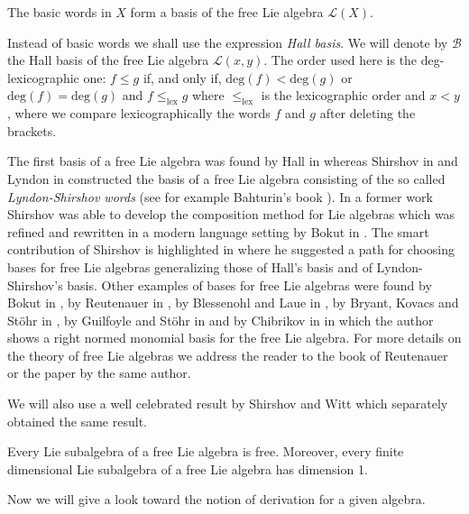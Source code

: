 \documentclass{cimart}
\begin{document}
\begin{theorem} 
The basic words in $X$ form a basis of the free Lie algebra $\mathcal{L}(X)$.
\end{theorem}

Instead of basic words we shall use the expression \textit{Hall basis}. We will denote by $\mathcal{B}$ the Hall basis of the free Lie algebra $\mathcal{L}(x, y)$. The order used here is the deg-lexicographic one: $f \leq g$ if, and only if, $\mbox{deg}(f) < \mbox{deg}(g)$ or $\mbox{deg}(f) = \mbox{deg}(g)$ and $f \leq_{\mbox{lex}} g$ where $\leq_{\mbox{lex}}$ is the lexicographic order and $x < y$, where we compare lexicographically the words $f$ and $g$ after deleting the brackets.

The first basis of a free Lie algebra was found by Hall in \cite{hal1} whereas Shirshov in \cite{shi2} and Lyndon in \cite{lyn1} constructed the basis of a free Lie algebra consisting of the so called \textit{Lyndon-Shirshov words} (see for example Bahturin's book \cite{Bah}). In a former work \cite{shi3} Shirshov was able to develop the composition method for Lie
algebras which was refined and rewritten in a modern language setting by Bokut in \cite{bok1}. The smart contribution of Shirshov is highlighted in \cite{shi2} where he suggested a path for choosing bases for free Lie algebras generalizing those of Hall's basis and of Lyndon-Shirshov's basis. Other  examples  of  bases  for  free  Lie  algebras  were  found  by  Bokut  in \cite{bok2}, by Reutenauer in \cite{reu1}, by Blessenohl and Laue in \cite{bll1}, by Bryant, Kovacs and St\"{o}hr in \cite{bks1}, by Guilfoyle and St\"{o}hr in \cite{gus1} and by Chibrikov in \cite{chi1} in which the author shows a right normed monomial basis for the free Lie algebra. For more details on the theory of free Lie algebras we address the reader to the book of Reutenauer \cite{reuten} or the paper \cite{reu1} by the same author.



We will also use a well celebrated result by Shirshov \cite{shi4} and Witt \cite{wit1} which separately obtained the same result.

\begin{theorem}\label{shirshovwitt}
Every Lie subalgebra of a free Lie algebra is free. Moreover, every finite dimensional Lie subalgebra of a free Lie algebra has dimension 1.
\end{theorem}

Now we will give a look toward the notion of derivation for a given algebra. 
\end{document}
